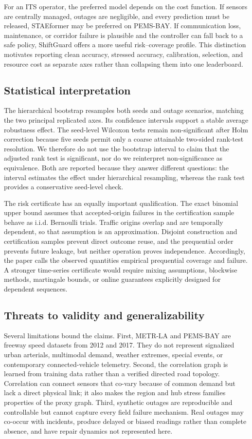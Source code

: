 \documentclass[pdflatex,sn-mathphys-num]{sn-jnl}
\begin{document}
For an ITS operator, the preferred model depends on the cost function. If
sensors are centrally managed, outages are negligible, and every prediction
must be released, STAEformer may be preferred on PEMS-BAY. If communication
loss, maintenance, or corridor failure is plausible and the controller can fall
back to a safe policy, ShiftGuard offers a more useful risk--coverage profile.
This distinction motivates reporting clean accuracy, stressed accuracy,
calibration, selection, and resource cost as separate axes rather than
collapsing them into one leaderboard.

\subsection{Statistical interpretation}
The hierarchical bootstrap resamples both seeds and outage scenarios, matching
the two principal replicated axes. Its confidence intervals support a stable
average robustness effect. The seed-level Wilcoxon tests remain non-significant
after Holm correction because five seeds permit only a coarse attainable
two-sided rank-test resolution. We therefore do not use the bootstrap interval
to claim that the adjusted rank test is significant, nor do we reinterpret
non-significance as equivalence. Both are reported because they answer
different questions: the interval estimates the effect under hierarchical
resampling, whereas the rank test provides a conservative seed-level check.

The risk certificate has an equally important qualification. The exact
binomial upper bound assumes that accepted-origin failures in the certification
sample behave as i.i.d. Bernoulli trials. Traffic origins overlap and are
temporally dependent, so that assumption is an approximation. Disjoint
construction and certification samples prevent direct outcome reuse, and the
prequential order prevents future leakage, but neither operation proves
independence. Accordingly, the paper calls the observed quantities empirical
prequential coverage and failure. A stronger time-series certificate would
require mixing assumptions, blockwise methods, martingale bounds, or online
guarantees explicitly designed for dependent sequences.

\subsection{Threats to validity and generalizability}
Several limitations bound the claims. First, METR-LA and PEMS-BAY are freeway
speed datasets from 2012 and 2017. They do not represent signalized urban
arterials, multimodal demand, weather extremes, special events, or contemporary
connected-vehicle telemetry. Second, the correlation graph is learned from
training data rather than a verified directed road topology. Correlation can
connect sensors that co-vary because of common demand but lack a direct physical
link; it also makes the region and hub stress families properties of the proxy
graph. Third, synthetic outages are reproducible and controllable but cannot
capture every field failure mechanism. Real outages may co-occur with incidents,
produce delayed or biased readings rather than complete absence, and have
repair dynamics not represented here.
\end{document}
